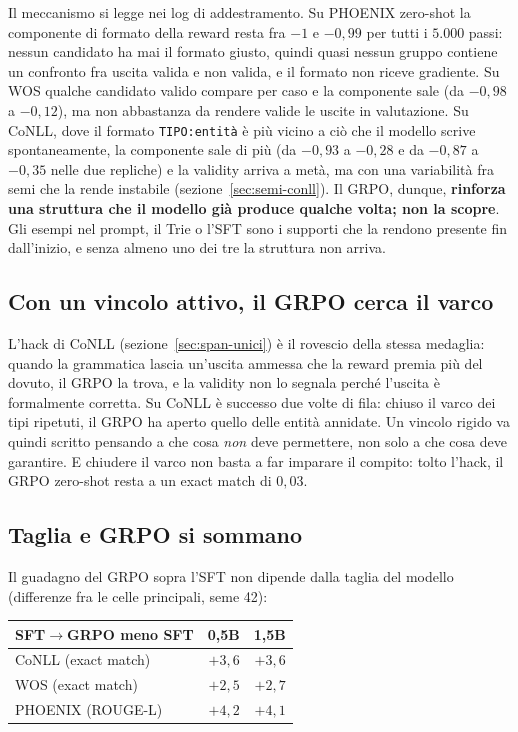 Il meccanismo si legge nei log di addestramento. Su PHOENIX zero-shot la
componente di formato della reward resta fra $-1$ e $-0{,}99$ per tutti i
$5.000$ passi: nessun candidato ha mai il formato giusto, quindi quasi nessun
gruppo contiene un confronto fra uscita valida e non valida, e il formato non
riceve gradiente. Su WOS qualche candidato valido compare per caso e la
componente sale (da $-0{,}98$ a $-0{,}12$), ma non abbastanza da rendere valide
le uscite in valutazione. Su CoNLL, dove il formato
\texttt{TIPO:entità} è più vicino a ciò che il modello scrive spontaneamente,
la componente sale di più (da $-0{,}93$ a $-0{,}28$ e da $-0{,}87$ a $-0{,}35$
nelle due repliche) e la validity arriva a metà, ma con una variabilità fra
semi che la rende instabile (sezione~\ref{sec:semi-conll}). Il GRPO, dunque,
\textbf{rinforza una struttura che il modello già produce qualche volta; non la
scopre}. Gli esempi nel prompt, il
Trie o l'SFT sono i supporti che la rendono presente fin dall'inizio, e senza
almeno uno dei tre la struttura non arriva.

\subsection{Con un vincolo attivo, il GRPO cerca il varco}

L'hack di CoNLL (sezione~\ref{sec:span-unici}) è il rovescio della stessa
medaglia: quando la grammatica lascia un'uscita ammessa che la reward premia più
del dovuto, il GRPO la trova, e la validity non lo segnala perché l'uscita è
formalmente corretta. Su CoNLL è successo due volte di fila: chiuso il varco
dei tipi ripetuti, il GRPO ha aperto quello delle entità annidate. Un vincolo
rigido va quindi scritto pensando a che cosa \emph{non} deve permettere, non
solo a che cosa deve garantire. E chiudere il varco non basta a far imparare il
compito: tolto l'hack, il GRPO zero-shot resta a un exact match di $0{,}03$.

\subsection{Taglia e GRPO si sommano}

Il guadagno del GRPO sopra l'SFT non dipende dalla taglia del modello (differenze fra le celle principali, seme 42):

\begin{center}
\small
\begin{tabular}{lrr}
\toprule
SFT$\to$GRPO meno SFT & 0,5B & 1,5B \\
\midrule
CoNLL (exact match)    & $+3{,}6$ & $+3{,}6$ \\
WOS (exact match)      & $+2{,}5$ & $+2{,}7$ \\
PHOENIX (ROUGE-L)      & $+4{,}2$ & $+4{,}1$ \\
\bottomrule
\end{tabular}
\end{center}

